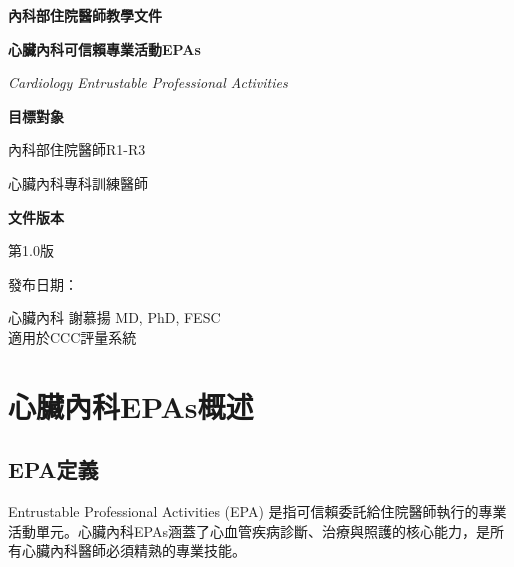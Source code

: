 \documentclass[12pt,a4paper]{article}
\newcommand{\mydate}{\DTMtoday}
\begin{document}
\begin{titlepage}
    \centering
    {\LARGE\textcolor{emergency_red}{\textbf{內科部住院醫師教學文件}}\par}
    \vspace{1cm}
    {\huge\bfseries 心臟內科可信賴專業活動EPAs\par}
    \vspace{0.5cm}
    {\Large\textcolor{emergency_blue}{\textit{Cardiology Entrustable Professional Activities}}\par}
    \vspace{1cm}
    
    \begin{tcolorbox}[
        colback=emergency_blue!5!white,
        colframe=emergency_blue,
        width=0.8\textwidth,
        arc=10pt,
        boxrule=1pt
    ]
    \centering
    {\large\textbf{目標對象}\par}
    \vspace{0.3cm}
    內科部住院醫師R1-R3\par
    心臟內科專科訓練醫師\par
    \vspace{0.5cm}
    {\large\textbf{文件版本}\par}
    \vspace{0.3cm}
    第1.0版\par
    發布日期：\mydate\par
    \end{tcolorbox}

    \vfill
    
    {\large 心臟內科 謝慕揚 MD, PhD, FESC\\
    適用於CCC評量系統\par}
    
    \vspace{0.5cm}
\end{titlepage}

\newpage
\tableofcontents
\newpage

\section{心臟內科EPAs概述}

\subsection{EPA定義}
Entrustable Professional Activities (EPA) 是指可信賴委託給住院醫師執行的專業活動單元。心臟內科EPAs涵蓋了心血管疾病診斷、治療與照護的核心能力，是所有心臟內科醫師必須精熟的專業技能。
\end{document}
